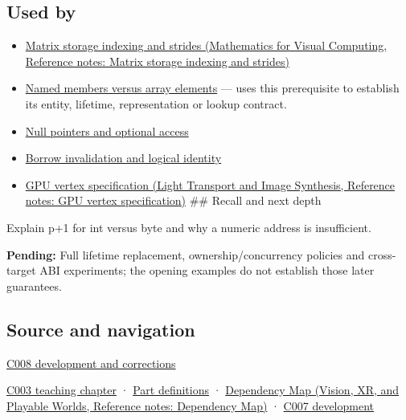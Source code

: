 \subsection{Used by}\label{appendix-6af5921bc853-used-by}

\begin{itemize}
\item
  \href{../02-Mathematics-for-Visual-Computing/main.pdf\#nameddest=appendix-ffdc1d4e5350}{Matrix storage indexing and strides (Mathematics for Visual Computing, Reference notes: Matrix storage indexing and strides)}
\item
  \hyperref[appendix-3f7e15effba6]{Named members versus array elements} --- uses this prerequisite to establish its entity, lifetime, representation or lookup contract.
\item
  \hyperref[appendix-afae48c31800]{Null pointers and optional access}
\item
  \hyperref[appendix-f9b8b9188c7f]{Borrow invalidation and logical identity}
\item
  \href{../04-Light-Transport-and-Image-Synthesis/main.pdf\#nameddest=appendix-749ba51a6c25}{GPU vertex specification (Light Transport and Image Synthesis, Reference notes: GPU vertex specification)} \#\# Recall and next depth
\end{itemize}

Explain p+1 for int versus byte and why a numeric address is insufficient.

\textbf{Pending:} Full lifetime replacement, ownership/concurrency policies and cross-target ABI experiments; the opening examples do not establish those later guarantees.

\subsection{Source and navigation}\label{appendix-6af5921bc853-source-and-navigation}

\hyperref[appendix-fd090d982a15-m008---parts-113-126]{C008 development and corrections}

\hyperref[01-foundations-i-ch002-where-the-bytes-live]{C003 teaching chapter} · \hyperref[appendix-fd090d982a15-m003---parts-41-60]{Part definitions} · \href{../07-Vision-XR-and-Playable-Worlds/main.pdf\#nameddest=appendix-4ad47bdd269a}{Dependency Map (Vision, XR, and Playable Worlds, Reference notes: Dependency Map)} · \hyperref[01-foundations-i-ch003-bringing-the-object-model-back-to-bytes]{C007 development}
